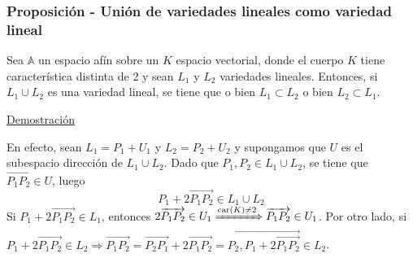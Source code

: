 \documentclass[12pt, a4paper, ones, notitlepage, openany,titlepage]{article}
\newcommand{\demostracion}{\noindent\underline{Demostración}}
\begin{document}
\subsubsection{Proposición - Unión de variedades lineales como variedad lineal}
Sea $\mathbb{A}$ un espacio afín sobre un $K$ espacio vectorial, donde el cuerpo $K$ tiene característica distinta de 2 y sean $L_{1}$ y $L_{2}$ variedades lineales. Entonces, si $L_1 \cup L_2$ es una variedad lineal, se tiene que o bien $L_{1} \subset L_{2}$ o bien $L_{2} \subset L_{1}$.

\demostracion

En efecto, sean $L_{1}=P_{1}+U_{1}$ y $L_{2}=P_{2}+U_{2}$ y supongamos que $U$ es el subespacio dirección de $L_{1} \cup L_{2}$. Dado que $P_{1}, P_{2} \in L_{1} \cup L_{2}$, se tiene que $\overrightarrow{P_{1} P_{2}} \in U$, luego
$$
P_{1}+2 \overrightarrow{P_{1} P_{2}} \in L_{1} \cup L_{2}
$$
\noindent Si $P_{1}+2 \overrightarrow{P_{1} P_{2}} \in L_{1}$, entonces $2 \overrightarrow{P_{1} P_{2}} \in U_{1} \xRightarrow{\operatorname{car}(K) \neq 2} \overrightarrow{P_1 P_2} \in U_1$. Por otro lado, si $P_{1}+2 \overrightarrow{P_{1} P_{2}} \in L_{2} \Longrightarrow \overrightarrow{P_{1} P_{2}}=\overrightarrow{P_{2} P_{1}}+2 \overrightarrow{P_{1} P_{2}}=\overrightarrow{P_{2}, P_{1}+2 \overrightarrow{P_{1} P_{2}}} \in L_2$.
\end{document}
